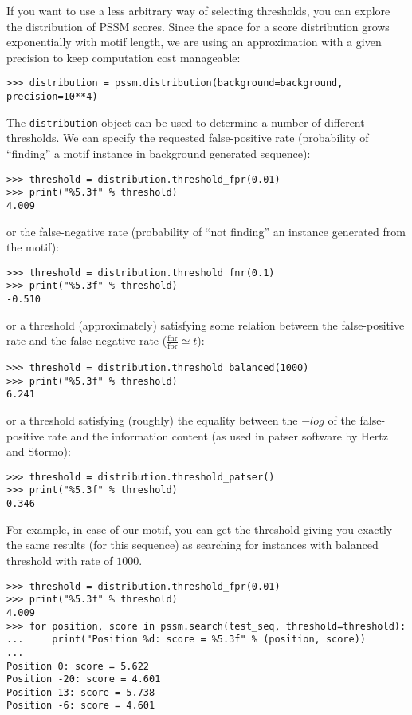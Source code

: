 If you want to use a less arbitrary way of selecting thresholds, you
can explore the distribution of PSSM scores. Since the space for a score
distribution grows exponentially with motif length, we are using an
approximation with a given precision to keep computation cost manageable:
\begin{verbatim}
>>> distribution = pssm.distribution(background=background, precision=10**4)
\end{verbatim}
The \verb+distribution+ object can be used to determine a number of different thresholds.
We can specify the requested false-positive rate (probability of ``finding'' a motif instance in background generated sequence):
\begin{verbatim}
>>> threshold = distribution.threshold_fpr(0.01)
>>> print("%5.3f" % threshold)
4.009
\end{verbatim}
or the false-negative rate (probability of ``not finding'' an instance generated from the motif):
\begin{verbatim}
>>> threshold = distribution.threshold_fnr(0.1)
>>> print("%5.3f" % threshold)
-0.510
\end{verbatim}
or a threshold (approximately) satisfying some relation between the false-positive rate and the false-negative rate ($\frac{\textrm{fnr}}{\textrm{fpr}}\simeq t$):
\begin{verbatim}
>>> threshold = distribution.threshold_balanced(1000)
>>> print("%5.3f" % threshold)
6.241
\end{verbatim}
or a threshold satisfying (roughly) the equality between the $-log$ of the
false-positive rate and the information content (as used in patser software by
Hertz and Stormo):
\begin{verbatim}
>>> threshold = distribution.threshold_patser()
>>> print("%5.3f" % threshold)
0.346
\end{verbatim}

For example, in case of our motif, you can get the threshold giving
you exactly the same results (for this sequence) as searching for
instances with balanced threshold with rate of $1000$.
\begin{verbatim}
>>> threshold = distribution.threshold_fpr(0.01)
>>> print("%5.3f" % threshold)
4.009
>>> for position, score in pssm.search(test_seq, threshold=threshold):
...     print("Position %d: score = %5.3f" % (position, score))
...
Position 0: score = 5.622
Position -20: score = 4.601
Position 13: score = 5.738
Position -6: score = 4.601
\end{verbatim}

